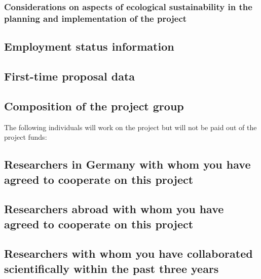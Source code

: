 \documentclass{scrartcl}
\begin{document}


\subsubsection{Considerations on aspects of ecological sustainability in the planning and implementation of the project}

\subsection{Employment status information}

\subsection{First-time proposal data}

\subsection{Composition of the project group}
The following individuals will work on the project but will not be paid out of
the project funds:

\subsection{Researchers in Germany with whom you have agreed to cooperate on this project}

\subsection{Researchers abroad with whom you have agreed to cooperate on this project}

\subsection{Researchers with whom you have collaborated scientifically within the past three years}
\end{document}
